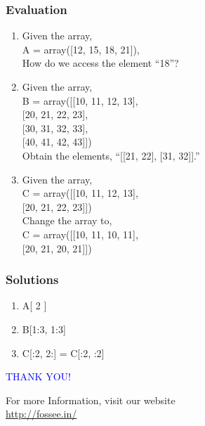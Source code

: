 \documentclass[presentation]{beamer}
\begin{document}
\begin{frame}
\frametitle{Evaluation}
\label{sec-14}


\begin{enumerate}
\item Given the array,\\ A = array([12, 15, 18, 21]),\\ How do we access the element ``18''?
\vspace{2pt}
\item Given the array,\\ 
B = array([[10, 11, 12, 13],\\
\hspace{1.64cm}  
           [20, 21, 22, 23],\\
\hspace{1.64cm}           
           [30, 31, 32, 33],\\
\hspace{1.64cm}           
           [40, 41, 42, 43]])\\
Obtain the elements, ``[[21, 22], [31, 32]].''
\vspace{2pt}         
\item Given the array, \\
 
     C = array([[10, 11, 12, 13],\\
\hspace{1.64cm}     
                [20, 21, 22, 23]])\\

     Change the array to, \\
   
    C = array([[10, 11, 10, 11],\\
\hspace{1.64cm}    
               [20, 21, 20, 21]])
\end{enumerate}
\end{frame}
\begin{frame}
\frametitle{Solutions}
\label{sec-15}


\begin{enumerate}
\item A[ 2 ]
\vspace{12pt}
\item B[1:3, 1:3]
\vspace{12pt}
\item C[:2, 2:] = C[:2, :2]
\end{enumerate}
\end{frame}
\begin{frame}

  \begin{block}{}
  \begin{center}
  \textcolor{blue}{\Large THANK YOU!} 
  \end{center}
  \end{block}
\begin{block}{}
  \begin{center}
    For more Information, visit our website\\
    \url{http://fossee.in/}
  \end{center}  
  \end{block}
\end{frame}
\end{document}
